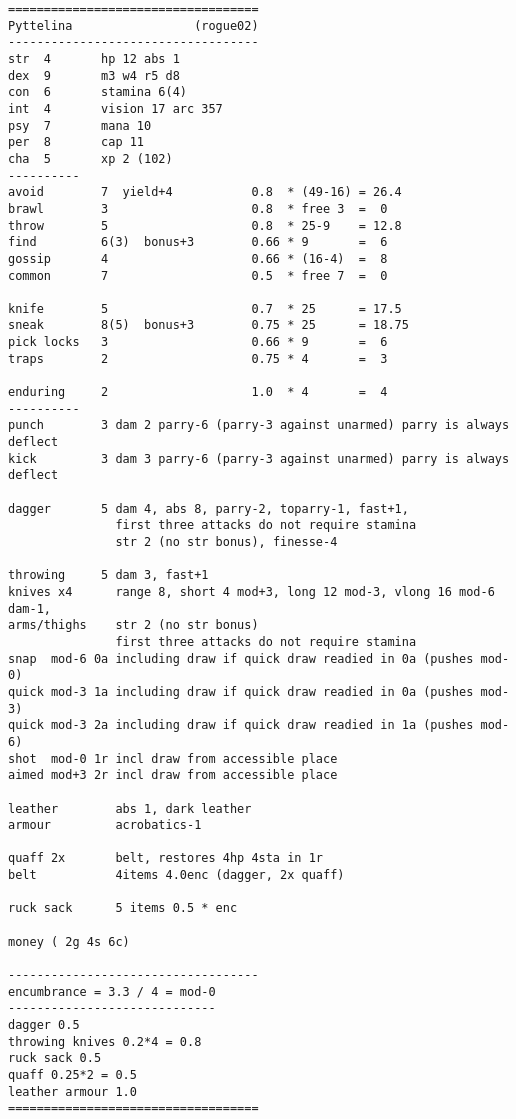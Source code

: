 \goodbreak
\tiny \begin{samepage} \begin{verbatim}
===================================
Pyttelina                 (rogue02)
-----------------------------------
str  4       hp 12 abs 1
dex  9       m3 w4 r5 d8
con  6       stamina 6(4)
int  4       vision 17 arc 357
psy  7       mana 10
per  8       cap 11
cha  5       xp 2 (102)
----------
avoid        7  yield+4           0.8  * (49-16) = 26.4
brawl        3                    0.8  * free 3  =  0
throw        5                    0.8  * 25-9    = 12.8
find         6(3)  bonus+3        0.66 * 9       =  6
gossip       4                    0.66 * (16-4)  =  8
common       7                    0.5  * free 7  =  0

knife        5                    0.7  * 25      = 17.5
sneak        8(5)  bonus+3        0.75 * 25      = 18.75
pick locks   3                    0.66 * 9       =  6
traps        2                    0.75 * 4       =  3

enduring     2                    1.0  * 4       =  4
----------
punch        3 dam 2 parry-6 (parry-3 against unarmed) parry is always deflect
kick         3 dam 3 parry-6 (parry-3 against unarmed) parry is always deflect

dagger       5 dam 4, abs 8, parry-2, toparry-1, fast+1,
               first three attacks do not require stamina
               str 2 (no str bonus), finesse-4

throwing     5 dam 3, fast+1
knives x4      range 8, short 4 mod+3, long 12 mod-3, vlong 16 mod-6 dam-1,
arms/thighs    str 2 (no str bonus)
               first three attacks do not require stamina
snap  mod-6 0a including draw if quick draw readied in 0a (pushes mod-0)
quick mod-3 1a including draw if quick draw readied in 0a (pushes mod-3)
quick mod-3 2a including draw if quick draw readied in 1a (pushes mod-6)
shot  mod-0 1r incl draw from accessible place
aimed mod+3 2r incl draw from accessible place

leather        abs 1, dark leather
armour         acrobatics-1

quaff 2x       belt, restores 4hp 4sta in 1r
belt           4items 4.0enc (dagger, 2x quaff)

ruck sack      5 items 0.5 * enc

money ( 2g 4s 6c)

-----------------------------------
encumbrance = 3.3 / 4 = mod-0
-----------------------------
dagger 0.5
throwing knives 0.2*4 = 0.8
ruck sack 0.5
quaff 0.25*2 = 0.5
leather armour 1.0
===================================
\end{verbatim} \end{samepage} \normalsize


